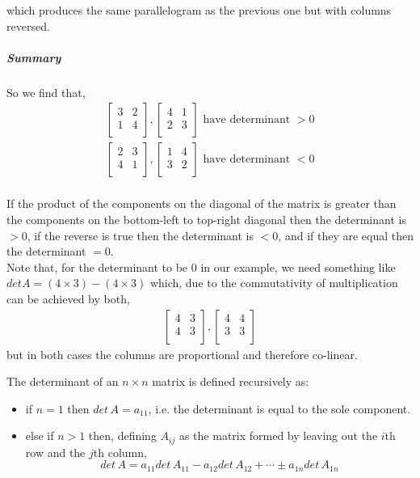 \documentclass[MathsNotesBase.tex]{subfiles}
\begin{document}
{		which produces the same parallelogram as the previous one but with columns reversed.
		\subparagraph{Summary} So we find that,
		\begin{align*}
		\begin{bmatrix}    
		3  &   2 \\
		1  &   4 \\		
		\end{bmatrix},
		\begin{bmatrix}    
		4  &   1 \\
		2  &   3 \\		
		\end{bmatrix}
		\text{ have determinant } > 0\\[10pt]
		\begin{bmatrix}    
		2  &   3 \\
		4  &   1 \\		
		\end{bmatrix},
		\begin{bmatrix}    
		1  &   4 \\
		3  &   2 \\		
		\end{bmatrix}
		\text{ have determinant } < 0\\[10pt]
		\end{align*}
		
		If the product of the components on the diagonal of the matrix is greater than the components on the bottom-left to top-right diagonal then the determinant is $> 0$, if the reverse is true then the determinant is $< 0$, and if they are equal then the determinant $= 0$.\\
		Note that, for the determinant to be $0$ in our example, we need something like $det A = (4 \times 3) - (4 \times 3)$ which, due to the commutativity of multiplication can be achieved by both,
		\begin{align*}
		\begin{bmatrix}    
		4  &   3 \\
		4  &   3 \\		
		\end{bmatrix},
		\begin{bmatrix}    
		4  &   4 \\
		3  &   3 \\		
		\end{bmatrix}
		\end{align*}
		but in both cases the columns are proportional and therefore co-linear.
		
		The determinant of an $n \times n$ matrix is defined recursively as:
		\begin{itemize}
		\item{if $n = 1$ then $det\, A = a_{11}$, i.e. the determinant is equal to the sole component.}
		\item{else if $n > 1$ then, defining $A_{ij}$ as the matrix formed by leaving out the $i$th row and the $j$th column,
				\[ det\, A = a_{11}det\, A_{11} - a_{12}det\, A_{12} + \cdots \pm a_{1n}det\, A_{1n} \]}
		\end{itemize}
		
}
\end{document}
